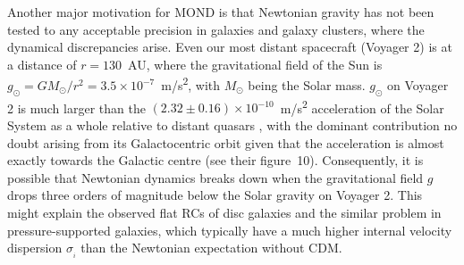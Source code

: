\documentclass[fleqn,usenatbib,useAMS,onecolumn]{mnras} %
\begin{document}
Another major motivation for MOND is that Newtonian gravity has not been tested to any acceptable precision in galaxies and galaxy clusters, where the dynamical discrepancies arise. Even our most distant spacecraft (Voyager 2) is at a distance of $r = 130$~AU, where the gravitational field of the Sun is $g_\odot = GM_\odot/r^2 = 3.5 \times 10^{-7}$~m/s\textsuperscript{2}, with $M_\odot$ being the Solar mass. $g_\odot$ on Voyager 2 is much larger than the $\left( 2.32 \pm 0.16 \right) \times 10^{-10}$~m/s\textsuperscript{2} acceleration of the Solar System as a whole relative to distant quasars \citep{Klioner_2021}, with the dominant contribution no doubt arising from its Galactocentric orbit given that the acceleration is almost exactly towards the Galactic centre (see their figure~10). Consequently, it is possible that Newtonian dynamics breaks down when the gravitational field $g$ drops three orders of magnitude below the Solar gravity on Voyager 2. This might explain the observed flat RCs of disc galaxies and the similar problem in pressure-supported galaxies, which typically have a much higher internal velocity dispersion $\sigma_{_i}$ than the Newtonian expectation without CDM.
\end{document}
